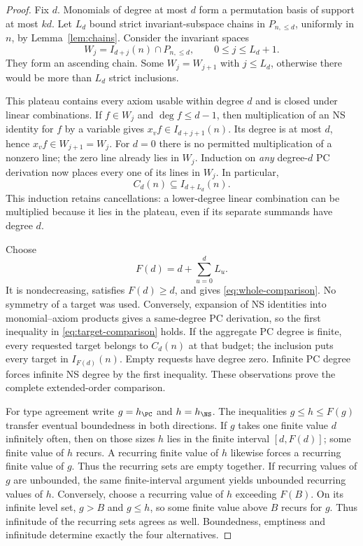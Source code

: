 \begin{proof}
Fix $d$. Monomials of degree at most $d$ form a permutation basis of
support at most $kd$. Let $L_d$ bound strict invariant-subspace chains in
$P_{n,\le d}$, uniformly in $n$, by Lemma~\ref{lem:chains}.
Consider the invariant spaces
\[
              W_j=I_{d+j}(n)\cap P_{n,\le d},
                    \qquad 0\le j\le L_d+1.
\]
They form an ascending chain. Some $W_j=W_{j+1}$ with $j\le L_d$,
otherwise there would be more than $L_d$ strict inclusions.

This plateau contains every axiom usable within degree $d$ and is closed
under linear combinations. If $f\in W_j$ and $\deg f\le d-1$, then
multiplication of an NS identity for $f$ by a variable gives
$x_vf\in I_{d+j+1}(n)$. Its degree is at most $d$, hence
$x_vf\in W_{j+1}=W_j$. For $d=0$ there is no permitted multiplication
of a nonzero line; the zero line already lies in $W_j$.
Induction on \emph{any} degree-$d$ PC derivation now places every one of
its lines in $W_j$. In particular,
\[
                          C_d(n)\subseteq I_{d+L_d}(n).
\]
This induction retains cancellations: a lower-degree linear combination
can be multiplied because it lies in the plateau, even if its separate
summands have degree $d$.

Choose
\[
                          F(d)=d+\sum_{u=0}^d L_u.
\]
It is nondecreasing, satisfies $F(d)\ge d$, and gives
\eqref{eq:whole-comparison}. No symmetry of a target was used.
Conversely, expansion of NS identities into monomial--axiom products
gives a same-degree PC derivation, so the first inequality in
\eqref{eq:target-comparison} holds. If the aggregate PC degree is finite,
every requested target belongs to $C_d(n)$ at that budget; the inclusion
puts every target in $I_{F(d)}(n)$. Empty requests have degree zero.
Infinite PC degree forces infinite NS degree by the first inequality.
These observations prove the complete extended-order comparison.

For type agreement write $g=h_{\PC}$ and $h=h_{\NS}$.
The inequalities $g\le h\le F(g)$ transfer eventual boundedness in both
directions. If $g$ takes one finite value $d$ infinitely often, then on
those sizes $h$ lies in the finite interval $[d,F(d)]$; some finite value
of $h$ recurs. A recurring finite value of $h$ likewise forces a recurring
finite value of $g$. Thus the recurring sets are empty together.
If recurring values of $g$ are unbounded, the same finite-interval
argument yields unbounded recurring values of $h$. Conversely, choose a
recurring value of $h$ exceeding $F(B)$. On its infinite level set,
$g>B$ and $g\le h$, so some finite value above $B$ recurs for $g$.
Thus infinitude of the recurring sets agrees as well. Boundedness,
emptiness and infinitude determine exactly the four alternatives.
\end{proof}

